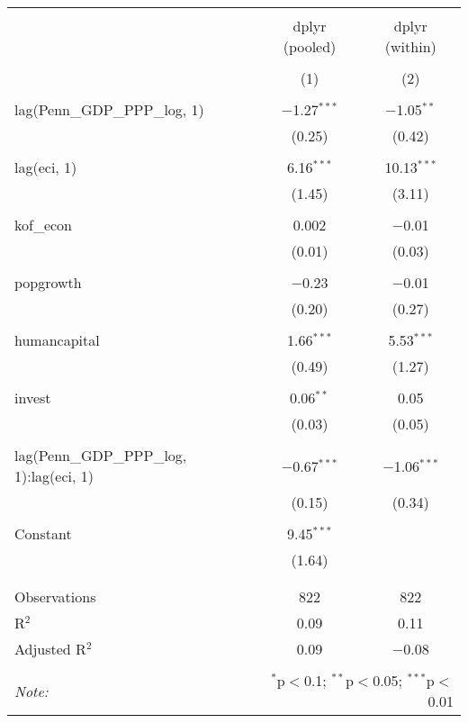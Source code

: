 
\begin{tabular}{@{\extracolsep{5pt}}lcc} 
\\[-1.8ex]\hline 
\hline \\[-1.8ex] 
 & dplyr (pooled) & dplyr (within) \\ 
\\[-1.8ex] & (1) & (2)\\ 
\hline \\[-1.8ex] 
 lag(Penn\_GDP\_PPP\_log, 1) & $-$1.27$^{***}$ & $-$1.05$^{**}$ \\ 
  & (0.25) & (0.42) \\ 
  & & \\ 
 lag(eci, 1) & 6.16$^{***}$ & 10.13$^{***}$ \\ 
  & (1.45) & (3.11) \\ 
  & & \\ 
 kof\_econ & 0.002 & $-$0.01 \\ 
  & (0.01) & (0.03) \\ 
  & & \\ 
 popgrowth & $-$0.23 & $-$0.01 \\ 
  & (0.20) & (0.27) \\ 
  & & \\ 
 humancapital & 1.66$^{***}$ & 5.53$^{***}$ \\ 
  & (0.49) & (1.27) \\ 
  & & \\ 
 invest & 0.06$^{**}$ & 0.05 \\ 
  & (0.03) & (0.05) \\ 
  & & \\ 
 lag(Penn\_GDP\_PPP\_log, 1):lag(eci, 1) & $-$0.67$^{***}$ & $-$1.06$^{***}$ \\ 
  & (0.15) & (0.34) \\ 
  & & \\ 
 Constant & 9.45$^{***}$ &  \\ 
  & (1.64) &  \\ 
  & & \\ 
\hline \\[-1.8ex] 
Observations & 822 & 822 \\ 
R$^{2}$ & 0.09 & 0.11 \\ 
Adjusted R$^{2}$ & 0.09 & $-$0.08 \\ 
\hline 
\hline \\[-1.8ex] 
\textit{Note:}  & \multicolumn{2}{r}{$^{*}$p$<$0.1; $^{**}$p$<$0.05; $^{***}$p$<$0.01} \\ 
\end{tabular} 
